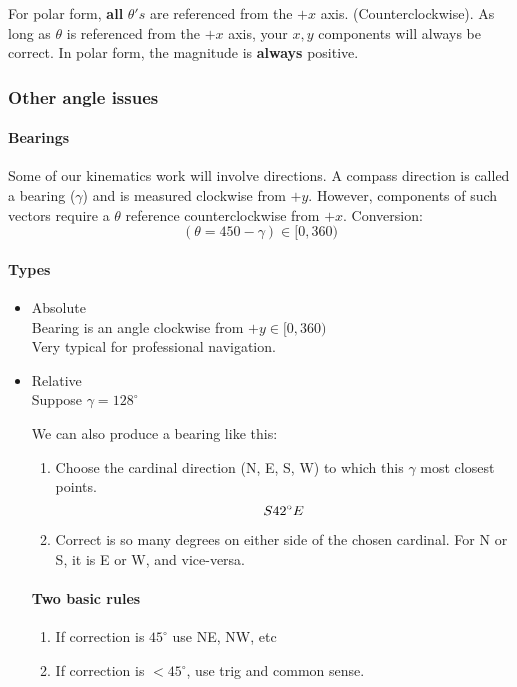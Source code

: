 \documentclass[letterpaper]{article}
\begin{document}
For polar form, {\bf all} $\theta's$ are referenced from the $+x$ axis.
    (Counterclockwise).
As long as $\theta$ is referenced from the $+x$ axis, your $x, y$ components
will always be correct. In polar form, the magnitude is {\bf always} positive.

\subsubsection{Other angle issues}
\paragraph{Bearings}
Some of our kinematics work will involve directions. A compass direction is
called a bearing ($\gamma$) and is measured clockwise from $+y$.
However, components of such vectors require a $\theta$ reference counterclockwise
from $+x$.
Conversion:
\[
    (\theta = 450 - \gamma) \in [0, 360)
\]
\paragraph{Types}
\begin{itemize}
    \item Absolute\hfill\\Bearing is an angle clockwise from $+y \in [0, 360)$
    \\ Very typical for professional navigation.
    \item Relative\hfill\\Suppose $\gamma = 128^{\circ}$
    
    We can also produce a bearing like this:
    \begin{enumerate}
        \item Choose the cardinal direction (N, E, S, W) to which this $\gamma$
        most closest points.
        \[
            S\hfill 42^{\circ} E
        \]
        \item Correct is so many degrees on either side of the chosen cardinal.
        For N or S, it is E or W, and vice-versa.
    \end{enumerate}
\paragraph{Two basic rules}
\begin{enumerate}
    \item If correction is $45^\circ$ use NE, NW, etc
    \item If correction is $<45^\circ$, use trig and common sense.
\end{enumerate}
\end{itemize}
\end{document}
